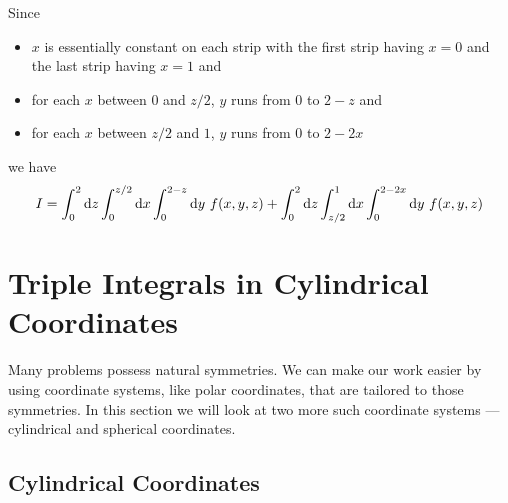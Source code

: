 \begin{eg}
\begin{efig}
\begin{center}
\end{center}
\end{efig}
Since
\begin{itemize} \itemsep1pt \parskip0pt 
\item
$x$ is essentially constant on each strip with the first strip having $x=0$ 
and the last strip having $x=1$ and
\item
for each $x$ between $0$ and $z/2$, $y$ runs from $0$ to $2-z$ and
\item
for each $x$ between $z/2$ and $1$, $y$ runs from $0$ to $2-2x$
\end{itemize}
we have
\begin{equation*}
I=\int_0^2\dee{z}\int_0^{z/2}\dee{x}\int_0^{2-z}\dee{y}\ f(x,y,z)
+\int_0^2\dee{z}\int_{z/2}^{1}\dee{x}\int_0^{2-2x}\dee{y}\ f(x,y,z)
\end{equation*}
\end{eg}

\section{Triple Integrals in Cylindrical Coordinates} \label{sec cylindrical}

Many problems possess natural symmetries. We can make our work easier 
by using coordinate systems, like  polar coordinates, that are 
tailored to those symmetries. In this section we will look at two 
more such coordinate systems --- cylindrical and spherical coordinates.

\subsection{Cylindrical Coordinates} \label{sec cylindrical coords}


